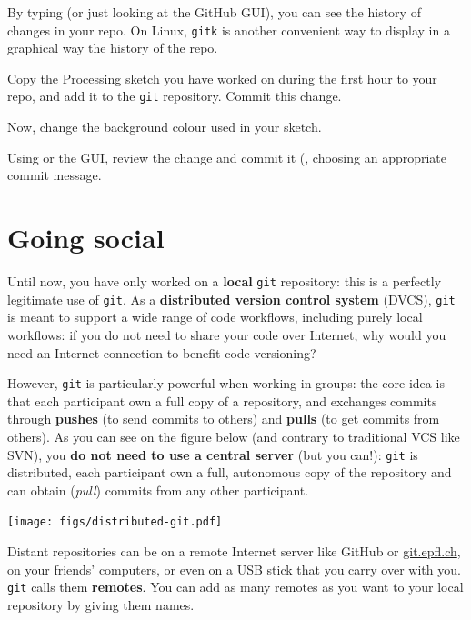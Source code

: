 \documentclass{instructions}
\newcommand{\git}{\texttt{git}\xspace}
\begin{document}

By typing  (or just looking at the GitHub GUI), you can see the
history of changes in your repo. On Linux, \texttt{gitk} is another
convenient way to display in a graphical way the history of the repo.


Copy the Processing sketch you have worked on during the first hour to your
repo, and add it to the \git repository. Commit this change.

Now, change the background colour used in your sketch.

Using  or the GUI, review the change and commit it (, choosing an appropriate commit message.

\part{Going social}

Until now, you have only worked on a \textbf{local} \git repository: this is a
perfectly legitimate use of \git. As a \textbf{distributed version control
system} (DVCS), \git is meant to support a wide range of code workflows,
including purely local workflows: if you do not need to share your code over
Internet, why would you need an Internet connection to benefit code versioning?

However, \git is particularly powerful when working in groups: the core idea is
that each participant own a full copy of a repository, and exchanges commits
through \textbf{pushes} (to send commits to others) and \textbf{pulls} (to get
commits from others). As you can see on the figure below (and contrary to
traditional VCS like SVN), you \textbf{do not
need to use a central server} (but you can!): \git is distributed, each
participant own a full, autonomous copy of the repository and can obtain
(\emph{pull}) commits from any other participant.

\begin{center}
    \texttt{[image: figs/distributed-git.pdf]}
\end{center}

Distant repositories can be on a remote Internet server like GitHub or
\url{git.epfl.ch}, on your friends' computers,
or even on a USB stick that you carry over with you. \git calls them
\textbf{remotes}. You can add as many remotes as you want to your local
repository by giving them names.
\end{document}

